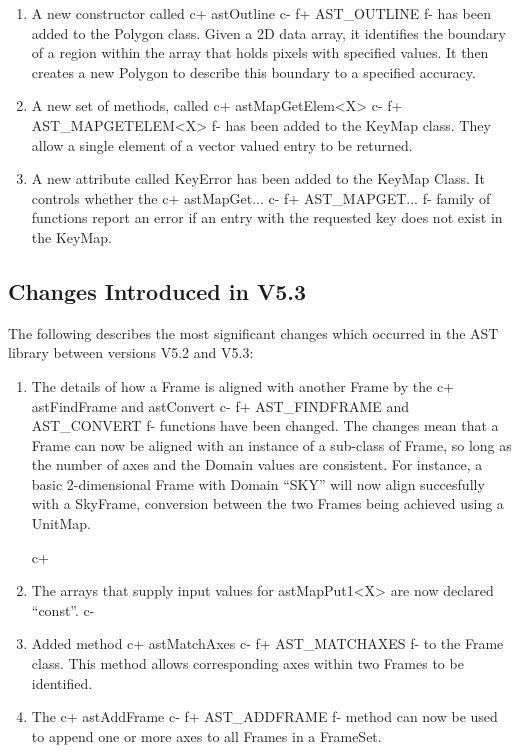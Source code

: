\documentclass[twoside,11pt]{starlink}
\begin{document}
\begin{enumerate}
\item A new constructor called
c+
astOutline
c-
f+
AST\_OUTLINE
f-
has been added to the Polygon class. Given a 2D data array, it identifies
the boundary of a region within the array that holds pixels with
specified values. It then creates a new Polygon to describe this boundary
to a specified accuracy.

\item A new set of methods, called
c+
astMapGetElem<X>
c-
f+
AST\_MAPGETELEM<X>
f-
has been added to the KeyMap class. They allow a single element of a vector
valued entry to be returned.

\item A new attribute called KeyError has been added to the KeyMap Class. It
controls whether the
c+
astMapGet...
c-
f+
AST\_MAPGET...
f-
family of functions report an error if an entry with the requested key does
not exist in the KeyMap.

\end{enumerate}

\subsection{Changes Introduced in V5.3}

The following describes the most significant changes which
occurred in the AST library between versions V5.2 and V5.3:

\begin{enumerate}

\item The details of how a Frame is aligned with another Frame by the
c+
astFindFrame and astConvert
c-
f+
AST\_FINDFRAME and AST\_CONVERT
f-
functions have been changed. The changes mean that a Frame can now be
aligned with an instance of a sub-class of Frame, so long as the number
of axes and the Domain values are consistent. For instance, a basic
2-dimensional Frame with Domain ``SKY'' will now align succesfully with
a SkyFrame, conversion between the two Frames being achieved using a
UnitMap.

c+
\item The arrays that supply input values for astMapPut1<X> are now
declared ``const''.
c-

\item Added method
c+
astMatchAxes
c-
f+
AST\_MATCHAXES
f-
to the Frame class. This method allows corresponding axes within two
Frames to be identified.

\item The
c+
astAddFrame
c-
f+
AST\_ADDFRAME
f-
method can now be used to append one or more axes to all Frames in a FrameSet.
\end{enumerate}
\end{document}
